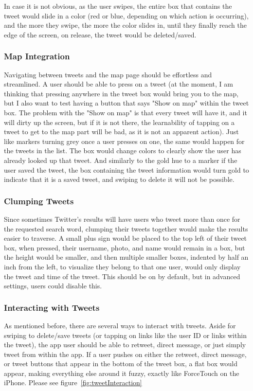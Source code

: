 \documentclass[11pt]{article}
\begin{document}
In case it is not obvious, as the user swipes, the entire box that contains the tweet would slide in a color (red or blue, depending on which action is occurring), and the more they swipe, the more the color slides in, until they finally reach the edge of the screen, on release, the tweet would be deleted/saved.

\subsubsection{Map Integration}
Navigating between tweets and the map page should be effortless and streamlined. A user should be able to press on a tweet (at the moment, I am thinking that pressing anywhere in the tweet box would bring you to the map, but I also want to test having a button that says "Show on map" within the tweet box. The problem with the "Show on map" is that every tweet will have it, and it will dirty up the screen, but if it is not there, the learnability of tapping on a tweet to get to the map part will be bad, as it is not an apparent action). Just like markers turning grey once a user presses on one, the same would happen for the tweets in the list. The box would change colors to clearly show the user has already looked up that tweet. And similarly to the gold hue to a marker if the user saved the tweet, the box containing the tweet information would turn gold to indicate that it is a saved tweet, and swiping to delete it will not be possible.

\subsubsection{Clumping Tweets}
Since sometimes Twitter's results will have users who tweet more than once for the requested search word, clumping their tweets together would make the results easier to traverse. A small plus sign would be placed to the top left of their tweet box, when pressed, their username, photo, and name would remain in a box, but the height would be smaller, and then multiple smaller boxes, indented by half an inch from the left, to visualize they belong to that one user, would only display the tweet and time of the tweet. This should be on by default, but in advanced settings, users could disable this.

\subsubsection{Interacting with Tweets}
As mentioned before, there are several ways to interact with tweets. Aside for swiping to delete/save tweets (or tapping on links like the user ID or links within the tweet), the app user should be able to retweet, direct message, or just simply tweet from within the app. If a user pushes on either the retweet, direct message, or tweet buttons that appear in the bottom of the tweet box, a  flat box would appear, making everything else around it fuzzy, exactly like ForceTouch on the iPhone. Please see figure~\ref{fig:tweetInteraction}
\end{document}
